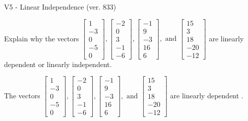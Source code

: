 \begin{exercise}
  \begin{exerciseTitle}V5 - Linear Independence (ver. 833)\end{exerciseTitle}
  \begin{exerciseStatement}
    Explain why the vectors \(\left[\begin{array}{r}
1 \\
-3 \\
0 \\
-5 \\
0
\end{array}\right] , \left[\begin{array}{r}
-2 \\
0 \\
3 \\
-1 \\
-6
\end{array}\right] , \left[\begin{array}{r}
-1 \\
9 \\
-3 \\
16 \\
6
\end{array}\right] , \text{ and } \left[\begin{array}{r}
15 \\
3 \\
18 \\
-20 \\
-12
\end{array}\right]\) are linearly dependent or linearly independent.	


  \end{exerciseStatement}
  \begin{exerciseAnswer}
   The vectors \(\left[\begin{array}{r}
1 \\
-3 \\
0 \\
-5 \\
0
\end{array}\right] , \left[\begin{array}{r}
-2 \\
0 \\
3 \\
-1 \\
-6
\end{array}\right] , \left[\begin{array}{r}
-1 \\
9 \\
-3 \\
16 \\
6
\end{array}\right] , \text{ and } \left[\begin{array}{r}
15 \\
3 \\
18 \\
-20 \\
-12
\end{array}\right]\) are 
  	 linearly dependent  .
  


  \end{exerciseAnswer}
\end{exercise}